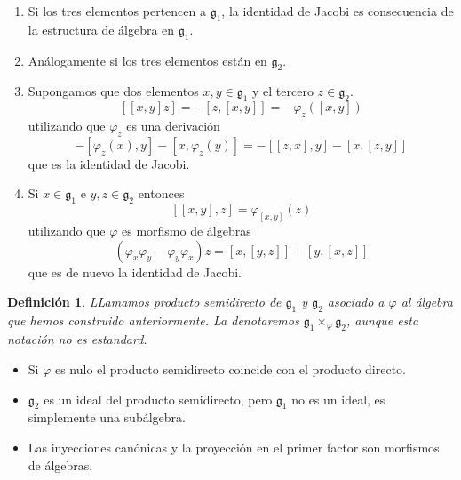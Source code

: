 \documentclass[a4paper,draft,12pt]{article}
\newtheorem{defi}{Definición}[section]%
\newcommand{\df}[1]{\textsf{\color{blue}#1}}
\begin{document}
\begin{enumerate}[1.- ]

\item Si los tres elementos pertencen a $\mathfrak{g}_1$, la identidad de Jacobi es consecuencia de la estructura de álgebra en $\mathfrak{g}_1$.

\item Análogamente si los tres elementos están en $\mathfrak{g}_2$.

\item Supongamos que dos elementos $x,y \in \mathfrak{g}_1$ y el tercero $z \in \mathfrak{g}_2$.
$$
[[x,y]z]=-[z,[x,y]]= -\varphi_z([x,y])
$$
utilizando que $\varphi_z$ es una derivación
$$
-[\varphi_z(x),y]-[x,\varphi_z(y)]= -[[z,x],y]-[x,[z,y]]
$$
que es la identidad de Jacobi.

\item Si $x \in \mathfrak{g}_1$ e $y,z \in \mathfrak{g}_2$ entonces
$$
[[x,y],z]= \varphi_{[x,y]}(z)
$$
utilizando que $\varphi$ es morfismo de álgebras
$$
(\varphi_x \varphi_y - \varphi_y\varphi_x)z = [x,[y,z]]+[y,[x,z]]
$$
que es de nuevo la identidad de Jacobi.

\end{enumerate}

\begin{defi}

LLamamos  \df{producto semidirecto}  de $\mathfrak{g}_1$ y $\mathfrak{g}_2$ asociado a $\varphi$ al álgebra que hemos construido anteriormente.  La denotaremos $\mathfrak{g}_1 \times_\varphi \mathfrak{g}_2$, aunque esta notación no es estandard.

\end{defi}


\begin{itemize}

\item Si $\varphi$ es nulo el producto semidirecto coincide con el producto directo.

\item $\mathfrak{g}_2$ es un ideal del producto semidirecto, pero $\mathfrak{g}_1$ no es un ideal, es simplemente una subálgebra.

\item Las inyecciones canónicas y la proyección en el primer factor son morfismos de álgebras.

\end{itemize}
\end{document}
